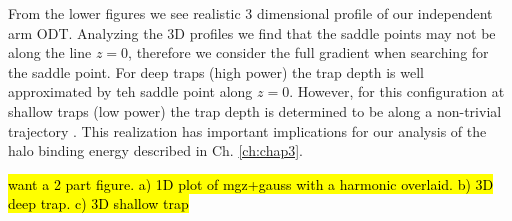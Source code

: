 From the lower figures we see realistic 3 dimensional profile of our independent arm ODT.
Analyzing the 3D profiles we find that the saddle points may not be along the line $z=0$, therefore we consider the full gradient when searching for the saddle point.
For deep traps (high power) the trap depth is well approximated by teh saddle point along $z=0$.
However, for this configuration at shallow traps (low power) the trap depth is determined to be along a non-trivial trajectory .
This realization has important implications for our analysis of the halo binding energy described in Ch. \ref{ch:chap3}.

\hl{want a 2 part figure. a) 1D plot of mgz+gauss with a harmonic overlaid. b) 3D deep trap. c) 3D shallow trap}

%
%
%
